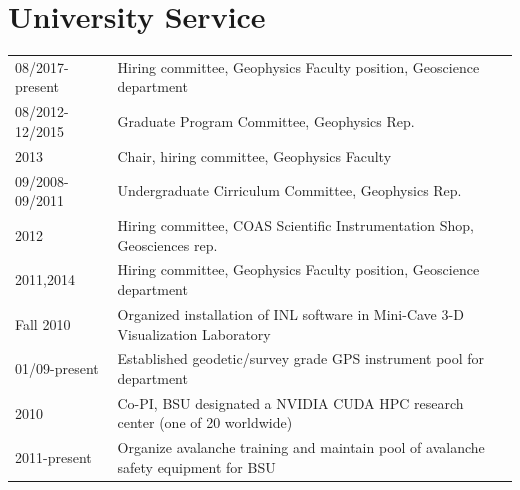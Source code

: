\documentclass[11pt]{article}
\renewcommand\arraystretch{1}
\begin{document}
\section*{University Service}
\begingroup
\renewcommand\arraystretch{0.7}
\begin{longtable}{p{1.2in}|p{5.7in}}
08/2017-present & Hiring committee, Geophysics Faculty position, Geoscience department \\
08/2012-12/2015 & Graduate Program Committee, Geophysics Rep. \\
2013 & Chair, hiring committee, Geophysics Faculty \\ 
09/2008-09/2011 & Undergraduate Cirriculum Committee, Geophysics Rep. \\
2012 & Hiring committee, COAS Scientific Instrumentation Shop, Geosciences rep. \\
2011,2014 & Hiring committee, Geophysics Faculty position, Geoscience department \\
Fall 2010 & Organized installation of INL software in Mini-Cave 3-D Visualization Laboratory \\
01/09-present & Established geodetic/survey grade GPS instrument pool for department \\
2010 & Co-PI, BSU designated a NVIDIA CUDA HPC research center (one of 20 worldwide)  \\
2011-present & Organize avalanche training and maintain pool of avalanche safety equipment for BSU \\ 
\end{longtable}
\endgroup
\end{document}
